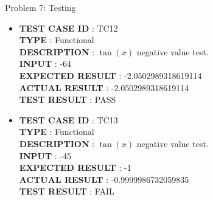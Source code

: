 \documentclass[a4paper,12pt]{article}
\begin{document}
\begin{section}{Problem 7: Testing}
\begin{itemize}
\subsubsection{$\tan(x)$ Negative Values Testing Reports}

\item \textbf{TEST CASE ID} \hspace{1.25cm} : TC12  \\
\textbf{TYPE } \hspace{3.15cm}  : Functional\\
\textbf{DESCRIPTION }\hspace{1.25cm} : $\tan(x)$ negative value test. \\
\textbf{INPUT} \hspace{3.05cm} :  -64 \\
\textbf{EXPECTED RESULT} \hspace{0.01cm} : -2.0502989318619114  \\
\textbf{ACTUAL RESULT} \hspace{0.6cm} : -2.0502989318619114  \\
\textbf{TEST RESULT} \hspace{1.40cm} : PASS \\

\item \textbf{TEST CASE ID} \hspace{1.25cm} : TC13  \\
\textbf{TYPE } \hspace{3.15cm}  : Functional\\
\textbf{DESCRIPTION }\hspace{1.25cm} : $\tan(x)$ negative value test. \\
\textbf{INPUT} \hspace{3.05cm} :  -45 \\
\textbf{EXPECTED RESULT} \hspace{0.01cm} : -1 \\
\textbf{ACTUAL RESULT} \hspace{0.6cm} : -0.9999986732059835 \\
\textbf{TEST RESULT} \hspace{1.40cm} : FAIL \\	


\end{itemize}
\end{section}
\end{document}
